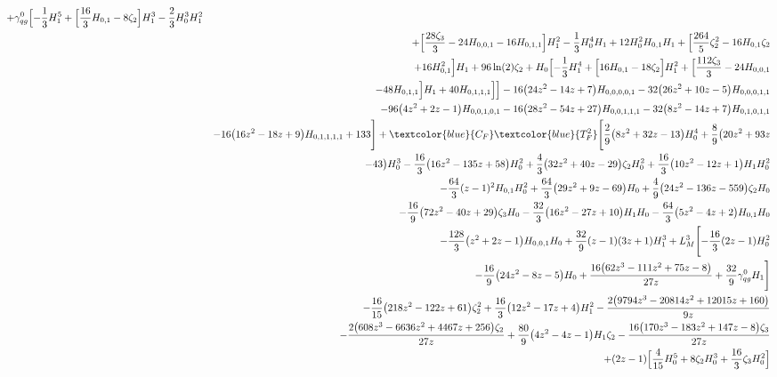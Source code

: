 \begin{eqnarray}
+{\gamma}_{qg}^{0} \Bigl[-\frac{1}{3}H_1^5+\Bigl[\frac{16}{3} H_{0,1}-8 \zeta_2\Bigr] H_1^3-\frac{2}{3} H_0^3H_1^2
\nonumber \\ &&
+\Bigl[\frac{28 \zeta_3}{3}-24 H_{0,0,1}-16 H_{0,1,1}\Bigr]H_1^2-\frac{1}{3} H_0^4 H_1+12 H_0^2 H_{0,1} H_1+\Bigl[\frac{264}{5} \zeta_2^2-16 H_{0,1} \zeta_2
\nonumber \\ &&
+16 H_{0,1}^2\Bigr] H_1+96 \ln(2) \zeta_2+H_0 \Bigl[-\frac{1}{3} H_1^4+\Bigl[16 H_{0,1}-18 \zeta_2\Bigr]H_1^2+\Bigl[\frac{112 \zeta_3}{3}-24 H_{0,0,1}
\nonumber \\ &&
-48 H_{0,1,1}\Bigr] H_1+40H_{0,1,1,1}\Bigr]\Bigr]-16 \big(24 z^2-14 z+7\big) H_{0,0,0,0,1}-32 \big(26z^2+10 z-5\big) H_{0,0,0,1,1}
\nonumber \\ &&
-96 \big(4 z^2+2 z-1\big) H_{0,0,1,0,1}-16\big(28 z^2-54 z+27\big) H_{0,0,1,1,1}-32 \big(8 z^2-14 z+7\big)H_{0,1,0,1,1}
\nonumber \\ &&
-16 \big(16 z^2-18 z+9\big) H_{0,1,1,1,1}+133\Biggr]
%
+\textcolor{blue}{C_F} \textcolor{blue}{T_F^2}
\Biggl[\frac{2}{9} \big(8 z^2+32 z-13\big) H_0^4+\frac{8}{9} \big(20 z^2+93 z
\nonumber \\ &&
-43\big) H_0^3 
-\frac{16}{3} \big(16 z^2-135 z+58\big) H_0^2+\frac{4}{3}\big(32 z^2+40 z-29\big) \zeta_2 H_0^2+\frac{16}{3} \big(10 z^2-12z+1\big) H_1 H_0^2
\nonumber \\ &&
-\frac{64}{3} (z-1)^2 H_{0,1} H_0^2+\frac{64}{3} \big(29z^2+9 z-69\big) H_0+\frac{4}{9} \big(24 z^2-136 z-559\big) \zeta_2H_0
\nonumber \\ &&
-\frac{16}{9} \big(72 z^2-40 z+29\big) \zeta_3 H_0-\frac{32}{3}\big(16 z^2-27 z+10\big) H_1 H_0-\frac{64}{3} \big(5 z^2-4 z+2\big) H_{0,1}H_0
\nonumber \\ &&
-\frac{128}{3} \big(z^2+2 z-1\big) H_{0,0,1} H_0+\frac{32}{9} (z-1) (3 z+1)H_1^3
+L_M^3 \Biggl[-\frac{16}{3} (2 z-1) H_0^2
\nonumber \\ &&
-\frac{16}{9} \big(24 z^2-8 z-5\big)H_0
+\frac{16 \big(62 z^3-111 z^2+75 z-8\big)}{27 z}+\frac{32}{9}{\gamma}_{qg}^{0} H_1\Biggr]
\nonumber \\ &&
-\frac{16}{15} \big(218 z^2-122 z+61\big) \zeta_2^2+\frac{16}{3} \big(12z^2-17 z+4\big) H_1^2-\frac{2 \big(9794 z^3-20814 z^2+12015 z+160\big)}{9  z}
\nonumber \\ &&
-\frac{2 \big(608 z^3-6636 z^2+4467 z+256\big) \zeta_2}{27  z}+\frac{80}{9} \big(4 z^2-4 z-1\big) H_1 \zeta_2
-\frac{16 \big(170 z^3-183 z^2+147 z-8\big) \zeta_3}{27 z}
\nonumber \\ &&
+(2 z-1)\Bigl[\frac{4}{15} H_0^5+8 \zeta_2 H_0^3+\frac{16}{3} \zeta_3 H_0^2\Bigr]

\end{eqnarray}
